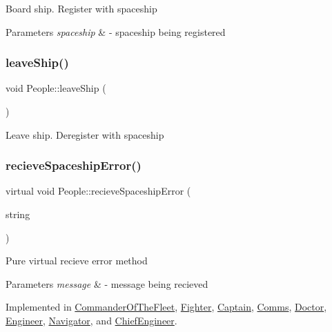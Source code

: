 Board ship. Register with spaceship 
\begin{DoxyParams}{Parameters}
{\em spaceship} & -\/ spaceship being registered \\
\hline
\end{DoxyParams}
\mbox{\label{classPeople_a5e87ed1cfd4d4d90b95e3b2196c7687e}} 
\subsubsection{\texorpdfstring{leave\+Ship()}{leaveShip()}}
{\footnotesize\ttfamily void People\+::leave\+Ship (\begin{DoxyParamCaption}{ }\end{DoxyParamCaption})}

Leave ship. Deregister with spaceship \mbox{\label{classPeople_a0685df78be631783138865e03cc7c85d}} 
\subsubsection{\texorpdfstring{recieve\+Spaceship\+Error()}{recieveSpaceshipError()}}
{\footnotesize\ttfamily virtual void People\+::recieve\+Spaceship\+Error (\begin{DoxyParamCaption}\item[{string}]{ }\end{DoxyParamCaption})\hspace{0.3cm}{\ttfamily [pure virtual]}}

Pure virtual recieve error method 
\begin{DoxyParams}{Parameters}
{\em message} & -\/ message being recieved \\
\hline
\end{DoxyParams}


Implemented in \hyperlink{classCommanderOfTheFleet_a13e91b9342df067b375f7ef2b929c0d5}{Commander\+Of\+The\+Fleet}, \hyperlink{classFighter_aecd2761c68aed8499e210fd0ca11c447}{Fighter}, \hyperlink{classCaptain_a39ebd40ec094b410f295188bb6262009}{Captain}, \hyperlink{classComms_a1aed1c01a813afd55309fdc59d2871bf}{Comms}, \hyperlink{classDoctor_a820dca3b9f05d3f69c47bd7318923b88}{Doctor}, \hyperlink{classEngineer_acc86ce6b4b1388be8ebacc685f9e6233}{Engineer}, \hyperlink{classNavigator_a7dc06965001f658cff3c5f0dcac39def}{Navigator}, and \hyperlink{classChiefEngineer_a7170ae93d7eadc1a68bc86c25a9be0db}{Chief\+Engineer}.

